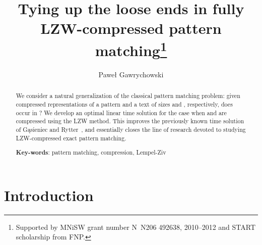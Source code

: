 \documentclass[runningheads]{llncs}
\begin{document}
\title{Tying up the loose ends in fully LZW-compressed pattern matching\thanks{Supported by MNiSW grant number N~N206 492638, 2010--2012 and START scholarship from FNP.}}

\author{Pawe\l{} Gawrychowski}

\maketitle

\begin{abstract}
We consider a natural generalization of the classical pattern matching problem: given compressed representations of a pattern  and a 
text  of sizes  and , respectively, does  occur in ? We develop an optimal linear time solution for the case when  and  are compressed using the LZW method. This improves the previously known  time solution of G\k{a}sieniec and Rytter~\cite{RytterGasieniec}, and essentially closes the line of research devoted to studying LZW-compressed exact pattern matching.

\textbf{Key-words}: pattern matching, compression, Lempel-Ziv
\end{abstract}

\section{Introduction}
\end{document}
